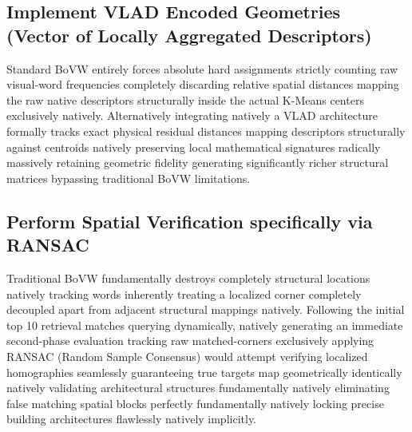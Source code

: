 \documentclass[11pt, a4paper]{article}
\begin{document}
\subsection{Implement VLAD Encoded Geometries (Vector of Locally Aggregated Descriptors)}
Standard BoVW entirely forces absolute hard assignments strictly counting raw visual-word frequencies completely discarding relative spatial distances mapping the raw native descriptors structurally inside the actual K-Means centers exclusively natively. Alternatively integrating natively a VLAD architecture formally tracks exact physical residual distances mapping descriptors structurally against centroids natively preserving local mathematical signatures radically massively retaining geometric fidelity generating significantly richer structural matrices bypassing traditional BoVW limitations.

\subsection{Perform Spatial Verification specifically via RANSAC}
Traditional BoVW fundamentally destroys completely structural locations natively tracking words inherently treating a localized corner completely decoupled apart from adjacent structural mappings natively. Following the initial top 10 retrieval matches querying dynamically, natively generating an immediate second-phase evaluation tracking raw matched-corners exclusively applying RANSAC (Random Sample Consensus) would attempt verifying localized homographies seamlessly guaranteeing true targets map geometrically identically natively validating architectural structures fundamentally natively eliminating false matching spatial blocks perfectly fundamentally natively locking precise building architectures flawlessly natively implicitly.
\end{document}

